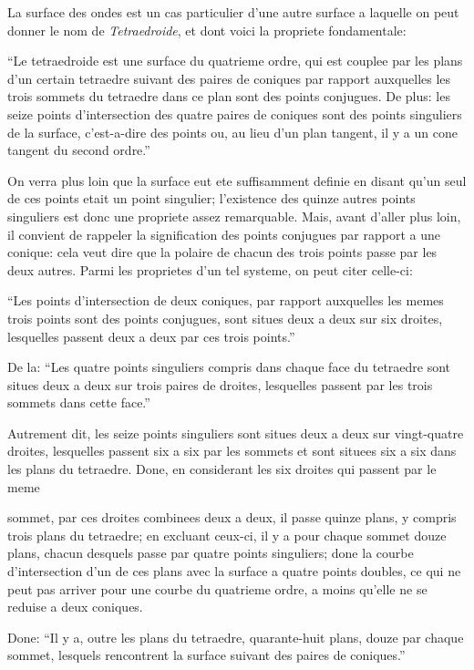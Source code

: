 \documentclass[11pt,a4paper]{book}
\begin{document}
\vspace{6pt}

La surface des ondes est un cas particulier d'une autre surface a laquelle on peut donner le nom de \textit{Tetraedroide}, et dont voici la propriete fondamentale:

``Le tetraedroide est une surface du quatrieme ordre, qui est couplee par les plans d'un certain tetraedre suivant des paires de coniques par rapport auxquelles les trois sommets du tetraedre dans ce plan sont des points conjugues. De plus: les seize points d'intersection des quatre paires de coniques sont des points singuliers de la surface, c'est-a-dire des points ou, au lieu d'un plan tangent, il y a un cone tangent du second ordre.''

On verra plus loin que la surface eut ete suffisamment definie en disant qu'un seul de ces points etait un point singulier; l'existence des quinze autres points singuliers est donc une propriete assez remarquable. Mais, avant d'aller plus loin, il convient de rappeler la signification des points conjugues par rapport a une conique: cela veut dire que la polaire de chacun des trois points passe par les deux autres. Parmi les proprietes d'un tel systeme, on peut citer celle-ci:

``Les points d'intersection de deux coniques, par rapport auxquelles les memes trois points sont des points conjugues, sont situes deux a deux sur six droites, lesquelles passent deux a deux par ces trois points.''

De la: ``Les quatre points singuliers compris dans chaque face du tetraedre sont situes deux a deux sur trois paires de droites, lesquelles passent par les trois sommets dans cette face.''

Autrement dit, les seize points singuliers sont situes deux a deux sur vingt-quatre droites, lesquelles passent six a six par les sommets et sont situees six a six dans les plans du tetraedre. Done, en considerant les six droites qui passent par le meme

\newpage
sommet, par ces droites combinees deux a deux, il passe quinze plans, y compris trois plans du tetraedre; en excluant ceux-ci, il y a pour chaque sommet douze plans, chacun desquels passe par quatre points singuliers; done la courbe d'intersection d'un de ces plans avec la surface a quatre points doubles, ce qui ne peut pas arriver pour une courbe du quatrieme ordre, a moins qu'elle ne se reduise a deux coniques.

Done: ``Il y a, outre les plans du tetraedre, quarante-huit plans, douze par chaque sommet, lesquels rencontrent la surface suivant des paires de coniques.''
\end{document}
